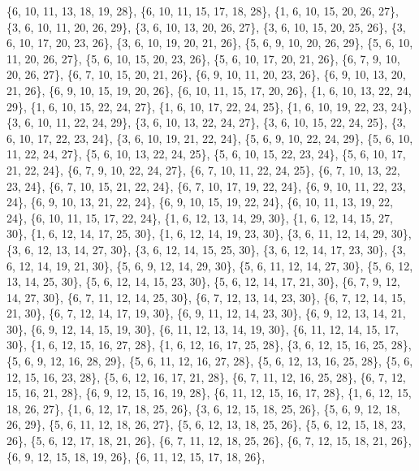 \documentclass[11pt,a4paper]{article}
\begin{document}
{\{6, 10, 11, 13, 18, 19, 28\}, \{6, 10, 11, 15, 17, 18, 28\}, \{1, 6, 10, 15, 20, 26, 27\}, \{3, 6, 10, 11, 20, 26, 29\}, \{3, 6, 10, 13, 20, 26, 27\},
\{3, 6, 10, 15, 20, 25, 26\}, \{3, 6, 10, 17, 20, 23, 26\}, \{3, 6, 10, 19, 20, 21, 26\}, \{5, 6, 9, 10, 20, 26, 29\}, \{5, 6, 10, 11, 20, 26, 27\},
\{5, 6, 10, 15, 20, 23, 26\}, \{5, 6, 10, 17, 20, 21, 26\}, \{6, 7, 9, 10, 20, 26, 27\}, \{6, 7, 10, 15, 20, 21, 26\}, \{6, 9, 10, 11, 20, 23, 26\},
\{6, 9, 10, 13, 20, 21, 26\}, \{6, 9, 10, 15, 19, 20, 26\}, \{6, 10, 11, 15, 17, 20, 26\}, \{1, 6, 10, 13, 22, 24, 29\}, \{1, 6, 10, 15, 22, 24, 27\},
\{1, 6, 10, 17, 22, 24, 25\}, \{1, 6, 10, 19, 22, 23, 24\}, \{3, 6, 10, 11, 22, 24, 29\}, \{3, 6, 10, 13, 22, 24, 27\}, \{3, 6, 10, 15, 22, 24, 25\},
\{3, 6, 10, 17, 22, 23, 24\}, \{3, 6, 10, 19, 21, 22, 24\}, \{5, 6, 9, 10, 22, 24, 29\}, \{5, 6, 10, 11, 22, 24, 27\}, \{5, 6, 10, 13, 22, 24, 25\},
\{5, 6, 10, 15, 22, 23, 24\}, \{5, 6, 10, 17, 21, 22, 24\}, \{6, 7, 9, 10, 22, 24, 27\}, \{6, 7, 10, 11, 22, 24, 25\}, \{6, 7, 10, 13, 22, 23, 24\},
\{6, 7, 10, 15, 21, 22, 24\}, \{6, 7, 10, 17, 19, 22, 24\}, \{6, 9, 10, 11, 22, 23, 24\}, \{6, 9, 10, 13, 21, 22, 24\}, \{6, 9, 10, 15, 19, 22, 24\},
\{6, 10, 11, 13, 19, 22, 24\}, \{6, 10, 11, 15, 17, 22, 24\}, \{1, 6, 12, 13, 14, 29, 30\}, \{1, 6, 12, 14, 15, 27, 30\}, \{1, 6, 12, 14, 17, 25, 30\},
\{1, 6, 12, 14, 19, 23, 30\}, \{3, 6, 11, 12, 14, 29, 30\}, \{3, 6, 12, 13, 14, 27, 30\}, \{3, 6, 12, 14, 15, 25, 30\}, \{3, 6, 12, 14, 17, 23, 30\},
\{3, 6, 12, 14, 19, 21, 30\}, \{5, 6, 9, 12, 14, 29, 30\}, \{5, 6, 11, 12, 14, 27, 30\}, \{5, 6, 12, 13, 14, 25, 30\}, \{5, 6, 12, 14, 15, 23, 30\},
\{5, 6, 12, 14, 17, 21, 30\}, \{6, 7, 9, 12, 14, 27, 30\}, \{6, 7, 11, 12, 14, 25, 30\}, \{6, 7, 12, 13, 14, 23, 30\}, \{6, 7, 12, 14, 15, 21, 30\},
\{6, 7, 12, 14, 17, 19, 30\}, \{6, 9, 11, 12, 14, 23, 30\}, \{6, 9, 12, 13, 14, 21, 30\}, \{6, 9, 12, 14, 15, 19, 30\}, \{6, 11, 12, 13, 14, 19, 30\},
\{6, 11, 12, 14, 15, 17, 30\}, \{1, 6, 12, 15, 16, 27, 28\}, \{1, 6, 12, 16, 17, 25, 28\}, \{3, 6, 12, 15, 16, 25, 28\}, \{5, 6, 9, 12, 16, 28, 29\},
\{5, 6, 11, 12, 16, 27, 28\}, \{5, 6, 12, 13, 16, 25, 28\}, \{5, 6, 12, 15, 16, 23, 28\}, \{5, 6, 12, 16, 17, 21, 28\}, \{6, 7, 11, 12, 16, 25, 28\},
\{6, 7, 12, 15, 16, 21, 28\}, \{6, 9, 12, 15, 16, 19, 28\}, \{6, 11, 12, 15, 16, 17, 28\}, \{1, 6, 12, 15, 18, 26, 27\}, \{1, 6, 12, 17, 18, 25, 26\},
\{3, 6, 12, 15, 18, 25, 26\}, \{5, 6, 9, 12, 18, 26, 29\}, \{5, 6, 11, 12, 18, 26, 27\}, \{5, 6, 12, 13, 18, 25, 26\}, \{5, 6, 12, 15, 18, 23, 26\},
\{5, 6, 12, 17, 18, 21, 26\}, \{6, 7, 11, 12, 18, 25, 26\}, \{6, 7, 12, 15, 18, 21, 26\}, \{6, 9, 12, 15, 18, 19, 26\}, \{6, 11, 12, 15, 17, 18, 26\},
}
\end{document}
